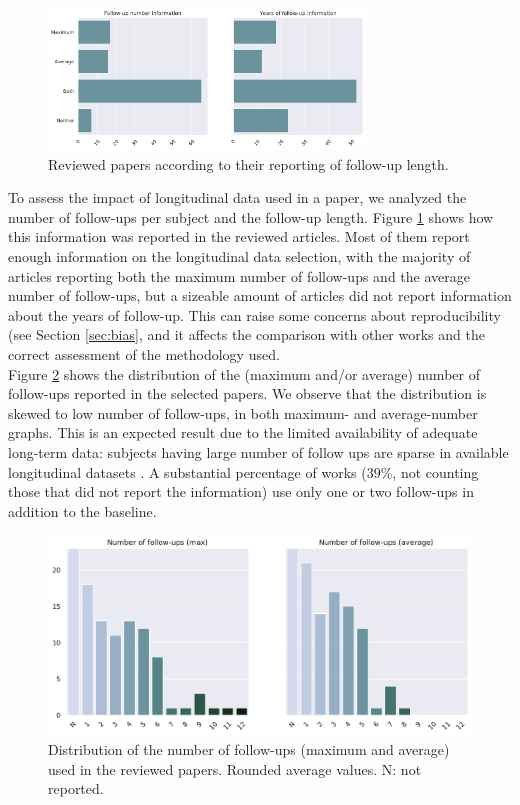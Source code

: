  \begin{figure}[!htbp]
\centering
\includegraphics[width=0.75\textwidth]{figures/review/Fig2.pdf}
    \caption{Reviewed papers according to their reporting of follow-up length.}\label{fig:followupsdist}
\end{figure}
 
To assess the impact of longitudinal data used in a paper, we analyzed the number of follow-ups per subject and the follow-up length. Figure \ref{fig:followupsdist} shows how this information was reported in the reviewed articles. Most of them report enough information on the longitudinal data selection, with the majority of articles reporting both the maximum number of follow-ups and the average number of follow-ups, but a sizeable amount of articles did not report information about the years of follow-up. This can raise some concerns about reproducibility (see Section \ref{sec:bias}, and it affects the comparison with other works and the correct assessment of the methodology used. \\

Figure \ref{fig:followups} shows the distribution of the (maximum and/or average) number of follow-ups reported in the selected papers. We observe that the distribution is skewed to low number of follow-ups, in both maximum- and average-number graphs. This is an expected result due to the limited availability of adequate long-term data: subjects having large number of follow ups are sparse in available longitudinal datasets \cite{Lawrence2017}. A substantial percentage of works ($39\%$, not counting those that did not report the information) use only one or two follow-ups in addition to the baseline. \\

\begin{figure}[!htbp]
\centering
\includegraphics[width=1.0\textwidth]{figures/review/Fig3.pdf}
    \caption[Distribution of the number of follow-ups used in the reviewed papers.]{Distribution of the number of follow-ups (maximum and average) used in the reviewed papers. Rounded average values. N: not reported.}\label{fig:followups}
\end{figure}

